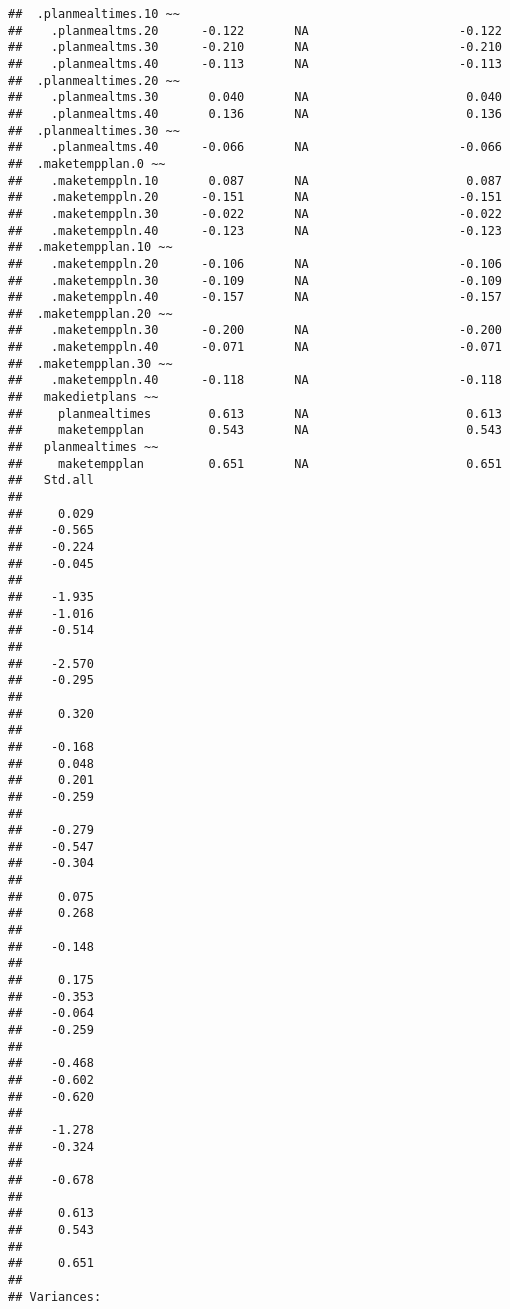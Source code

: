 \documentclass{article}\usepackage[]{graphicx}\usepackage[]{color}
\makeatletter
\newenvironment{kframe}{%
 \def\at@end@of@kframe{}%
 \ifinner\ifhmode%
  \def\at@end@of@kframe{\end{minipage}}%
  \begin{minipage}{\columnwidth}%
 \fi\fi%
 \def\FrameCommand##1{\hskip\@totalleftmargin \hskip-\fboxsep
 \colorbox{shadecolor}{##1}\hskip-\fboxsep
     \hskip-\linewidth \hskip-\@totalleftmargin \hskip\columnwidth}%
 \MakeFramed {\advance\hsize-\width
   \@totalleftmargin\z@ \linewidth\hsize
   \@setminipage}}%
 {\par\unskip\endMakeFramed%
 \at@end@of@kframe}
\newenvironment{knitrout}{}{} %
\makeatother
\begin{document}
\begin{knitrout}
\begin{kframe}
\begin{verbatim}
##  .planmealtimes.10 ~~                                             
##    .planmealtms.20      -0.122       NA                     -0.122
##    .planmealtms.30      -0.210       NA                     -0.210
##    .planmealtms.40      -0.113       NA                     -0.113
##  .planmealtimes.20 ~~                                             
##    .planmealtms.30       0.040       NA                      0.040
##    .planmealtms.40       0.136       NA                      0.136
##  .planmealtimes.30 ~~                                             
##    .planmealtms.40      -0.066       NA                     -0.066
##  .maketempplan.0 ~~                                               
##    .maketemppln.10       0.087       NA                      0.087
##    .maketemppln.20      -0.151       NA                     -0.151
##    .maketemppln.30      -0.022       NA                     -0.022
##    .maketemppln.40      -0.123       NA                     -0.123
##  .maketempplan.10 ~~                                              
##    .maketemppln.20      -0.106       NA                     -0.106
##    .maketemppln.30      -0.109       NA                     -0.109
##    .maketemppln.40      -0.157       NA                     -0.157
##  .maketempplan.20 ~~                                              
##    .maketemppln.30      -0.200       NA                     -0.200
##    .maketemppln.40      -0.071       NA                     -0.071
##  .maketempplan.30 ~~                                              
##    .maketemppln.40      -0.118       NA                     -0.118
##   makedietplans ~~                                                
##     planmealtimes        0.613       NA                      0.613
##     maketempplan         0.543       NA                      0.543
##   planmealtimes ~~                                                
##     maketempplan         0.651       NA                      0.651
##   Std.all
##          
##     0.029
##    -0.565
##    -0.224
##    -0.045
##          
##    -1.935
##    -1.016
##    -0.514
##          
##    -2.570
##    -0.295
##          
##     0.320
##          
##    -0.168
##     0.048
##     0.201
##    -0.259
##          
##    -0.279
##    -0.547
##    -0.304
##          
##     0.075
##     0.268
##          
##    -0.148
##          
##     0.175
##    -0.353
##    -0.064
##    -0.259
##          
##    -0.468
##    -0.602
##    -0.620
##          
##    -1.278
##    -0.324
##          
##    -0.678
##          
##     0.613
##     0.543
##          
##     0.651
## 
## Variances:

\end{verbatim}
\end{kframe}
\end{knitrout}
\end{document}

